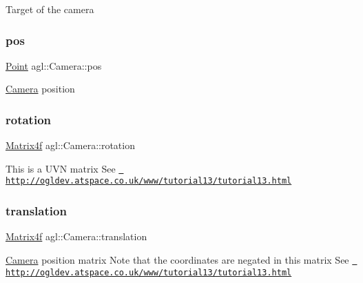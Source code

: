 Target of the camera \mbox{\label{classagl_1_1Camera_a4156ee2c5c0f0dc780d603245baaf081}} 
\subsubsection{\texorpdfstring{pos}{pos}}
{\footnotesize\ttfamily \mbox{\hyperlink{classagl_1_1Point}{Point}} agl\+::\+Camera\+::pos\hspace{0.3cm}{\ttfamily [private]}}

\mbox{\hyperlink{classagl_1_1Camera}{Camera}} position \mbox{\label{classagl_1_1Camera_a89073494f44e962e4929d89c0e45fb1f}} 
\subsubsection{\texorpdfstring{rotation}{rotation}}
{\footnotesize\ttfamily \mbox{\hyperlink{classagl_1_1Matrix4f}{Matrix4f}} agl\+::\+Camera\+::rotation\hspace{0.3cm}{\ttfamily [private]}}

This is a U\+VN matrix See \href{http://ogldev.atspace.co.uk/www/tutorial13/tutorial13.html}{\texttt{ http\+://ogldev.\+atspace.\+co.\+uk/www/tutorial13/tutorial13.\+html}} \mbox{\label{classagl_1_1Camera_a7f144f218001278cf7ef6e076b62c1dd}} 
\subsubsection{\texorpdfstring{translation}{translation}}
{\footnotesize\ttfamily \mbox{\hyperlink{classagl_1_1Matrix4f}{Matrix4f}} agl\+::\+Camera\+::translation\hspace{0.3cm}{\ttfamily [private]}}

\mbox{\hyperlink{classagl_1_1Camera}{Camera}} position matrix Note that the coordinates are negated in this matrix See \href{http://ogldev.atspace.co.uk/www/tutorial13/tutorial13.html}{\texttt{ http\+://ogldev.\+atspace.\+co.\+uk/www/tutorial13/tutorial13.\+html}} \mbox{\label{classagl_1_1Camera_a654f2c23bdb8610c75a0fe8dcac82e99}} 
